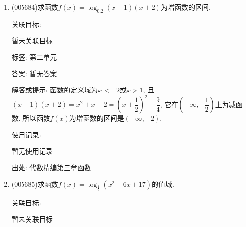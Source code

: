 \documentclass[10pt,a4paper]{article}
\newcommand{\blank}[1]{\underline{\hbox to #1pt{}}}
\begin{document}
\begin{enumerate}[1.]
标签: 第二单元

答案: 暂无答案

解答或提示: 解法一  因为$ 0<x<1$, 所以$ 1-x\in (0,1)$, $1+x\in (1,2)$, $1-x^2\in (0,1)$.
若$a>1$, 则$\log_a(1-x)<0$, $\log_a(1+x)>0$,
所以$ q-p=\log_a(1+x)+\log_a(1-x)=\log_a(1-x^2)<0$, 所以$ q<p$;
若$0<a<1$, 则$\log_a(1+x)<0$, $\log_a(1-x)>0$,
所以$ q-p=-\log_a(1+x)-\log_a(1-x)=-\log_a(1-x^2)<0$, 所以$ q<p$.故恒有$p>q$.
解法二  因为$ \dfrac pq=|\dfrac{\log_a(1-x)}{\log_a(1+x)}|=|\log_{(1+x)}(1-x)|=-\log_{(1+x)}(1-x)$
\blank{50}$=\log_{(1+x)}\dfrac 1{1-x}=\log_{(1+x)}\dfrac{1+x}{1-x^2}=1-\log_{(1+x)}(1-x^2),$
且$1+x>1$, $0<1-x^2<1$, 所以$ \log_{(1+x)}(1-x^2)<0$, 于是$\dfrac pq>1$.又$p>0$, $q>0$, 故$p>q$.
解法三  $p^2-q^2=\log_a^2(1-x)-\log_a^2(2+x)=\log_a(1-x^2)\cdot \log_a\dfrac{1-x}{1+x}$,
且$0<1-x^2<1$, $0<\dfrac{1-x}{1+x}<1$, 故无论$a>1$还是$0<a<1$, $\log_a(1-x^2)$和$\log_a\dfrac{1-x}{1+x}$一定同号, 所以$ p^2-q^2>0$.又$p>0$, $q>0$, 所以$ p>q$.
解法四  因为$ p-q=|\log_a(1-x)|-|\log_a(1+x)|=\dfrac 1{|\lg a|}(|\lg (1-x)|-|\lg (1+x)|)$
\blank{50}$=\dfrac 1{|\lg a|}[-\lg (1-x)-\lg (1+x)]=\dfrac 1{|\lg a|}\lg (1-x^2)>0$,
所以$ p>q$.
解法五  因为$ \log_a(1-x)=\log_a\dfrac{1-x^2}{1+x}=\log_a(1-x^2)-\log_a(1+x)$,
且$\log_a(1-x^2)$与$\log_a(1+x)$异号,
所以$ p=|\log_a(1-x)|=|\log_a(1-x^2)-\log_a(1+x)|$
    $=|\log_a(1-x^2)|+|\log_a(1+x)|>|\log_a(1+x)|=q$,
即$p>q$.

使用记录:

暂无使用记录


出处: 代数精编第三章函数
\item { (005684)}求函数$f(x)=\log_{0.2}(x-1)(x+2)$为增函数的区间.


关联目标:

暂未关联目标



标签: 第二单元

答案: 暂无答案

解答或提示: 函数的定义域为$x<-2$或$x>1$, 且$(x-1)(x+2)=x^2+x-2=(x+\dfrac 12)^2-\dfrac 94$, 它在$(-\infty ,-\dfrac 12)$上为减函数.
所以函数$f(x)$为增函数的区间是$(-\infty ,-2)$.

使用记录:

暂无使用记录


出处: 代数精编第三章函数
\item { (005685)}求函数$f(x)=\log_{\frac 12}(x^2-6x+17)$的值域.


关联目标:

暂未关联目标




\end{enumerate}
\end{document}
